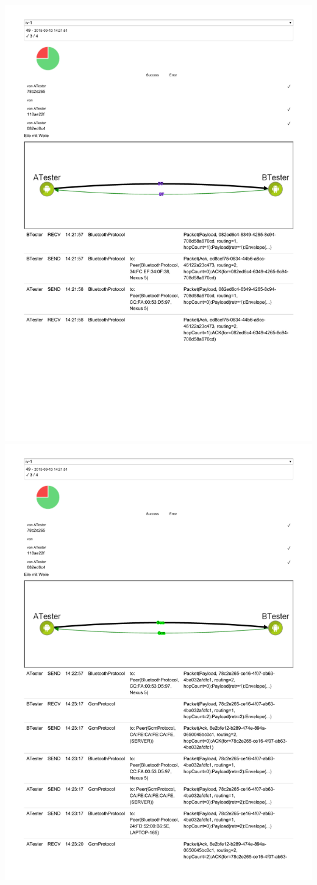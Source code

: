 \includegraphics[trim=0 100 0 0,clip,scale=0.8]{belege/manuelle-tests/netzwerk/Dashboardauszuege/Netzwerktest_n-iv-1b.pdf}
\clearpage
\includegraphics[trim=0 100 0 0,clip,scale=0.8]{belege/manuelle-tests/netzwerk/Dashboardauszuege/Netzwerktest_n-iv-1c.pdf}
\clearpage
